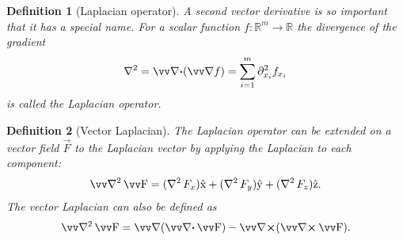 \documentclass[twocolumn, margin=small]{tex/hsrzf}
\theoremstyle{fuvarzf}
\newtheorem{definition}{Definition}
\begin{document}
\begin{definition}[Laplacian operator]
  A second vector derivative is so important that it has a special name.  For a
  scalar function \(f: \mathbb{R}^m \to \mathbb{R}\) the divergence of the
  gradient
  \[
    \laplacian = \div (\grad f) = \sum_{i=1}^m \partial_{x_i}^2 f_{x_i}
  \]
  is called the \emph{Laplacian operator}.
\end{definition}

\begin{definition}[Vector Laplacian]
  The Laplacian operator can be extended on a vector field \(\vec{F}\) to the 
  \emph{Laplacian vector} by applying the Laplacian to each component:
  \[
    \vlaplacian \vec{F} 
      = (\laplacian F_x)\uvec{x} 
      + (\laplacian F_y)\uvec{y} 
      + (\laplacian F_z)\uvec{z} .
  \]
  The vector Laplacian can also be defined as
  \[
    \vlaplacian \vec{F} = \grad (\div \vec{F}) - \curl (\curl \vec{F}).
  \]
\end{definition}
\end{document}
